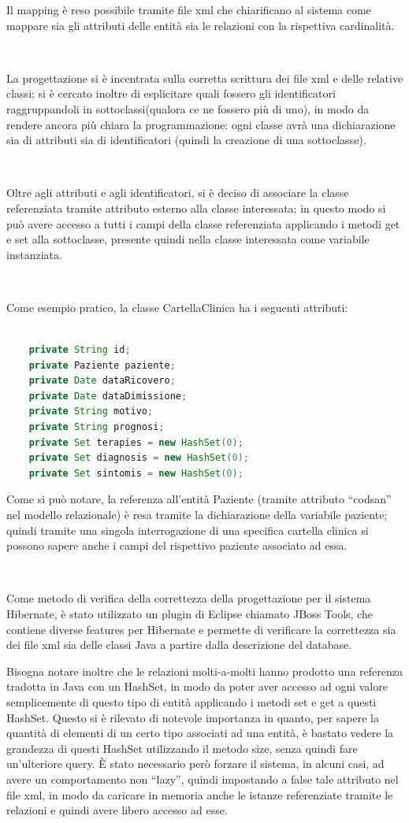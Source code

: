 \documentclass[a4paper,titlepage]{article}
\begin{document}
Il mapping è reso possibile tramite file xml che chiarificano al sistema come mappare sia gli attributi delle entità sia le relazioni con la rispettiva cardinalità.

~

La progettazione si è incentrata sulla corretta scrittura dei file xml e delle relative classi; si è cercato inoltre di esplicitare quali fossero gli identificatori raggruppandoli in sottoclassi(qualora ce ne fossero più di uno), in modo da rendere ancora più chiara la programmazione: ogni classe avrà una dichiarazione sia di attributi sia di identificatori (quindi la creazione di una sottoclasse).

~

Oltre agli attributi e agli identificatori, si è deciso di associare la classe referenziata tramite attributo esterno alla classe interessata; in questo modo si può avere accesso a tutti i campi della classe referenziata applicando i metodi get e set alla sottoclasse, presente quindi nella classe interessata come variabile instanziata.

~

Come esempio pratico, la classe CartellaClinica ha i seguenti attributi:

\begin{lstlisting}[language=java]

	private String id;
	private Paziente paziente;
	private Date dataRicovero;
	private Date dataDimissione;
	private String motivo;
	private String prognosi;
	private Set terapies = new HashSet(0);
	private Set diagnosis = new HashSet(0);
	private Set sintomis = new HashSet(0);

\end{lstlisting}

Come si può notare, la referenza all'entità Paziente (tramite attributo ``codsan'' nel modello relazionale) è resa tramite la dichiarazione della variabile paziente; quindi tramite una singola interrogazione di una specifica cartella clinica si possono sapere anche i campi del rispettivo paziente associato ad essa.

~

Come metodo di verifica della correttezza della progettazione per il sistema Hibernate, è stato utilizzato un plugin di Eclipse chiamato JBoss Tools, che contiene diverse features per Hibernate e permette di verificare la correttezza sia dei file xml sia delle classi Java a partire dalla descrizione del database.

Bisogna notare inoltre che le relazioni molti-a-molti hanno prodotto una referenza tradotta in Java con un HashSet, in modo da poter aver accesso ad ogni valore semplicemente di questo tipo di entità applicando i metodi set e get a questi HashSet. Questo si è rilevato di notevole importanza in quanto, per sapere la quantità di elementi di un certo tipo associati ad una entità, è bastato vedere la grandezza di questi HashSet utilizzando il metodo size, senza quindi fare un'ulteriore query. È stato necessario però forzare il sistema, in alcuni casi, ad avere un comportamento non ``lazy'', quindi impostando a false tale attributo nel file xml, in modo da caricare in memoria anche le istanze referenziate tramite le relazioni e quindi avere libero accesso ad esse. 
\end{document}
